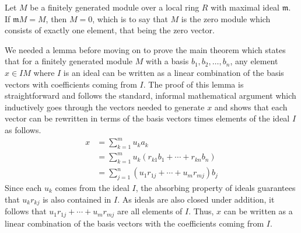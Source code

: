 \documentclass{article}
\begin{document}
\begin{theorem}
  Let \(M\) be a finitely generated module over a local ring \(R\) with maximal
  ideal \(\mathfrak{m}\). If \(\mathfrak{m} M = M\), then \(M = 0\), which is
  to say that \(M\) is the zero module which consists of exactly one element,
  that being the zero vector.
\end{theorem}

We needed a lemma before moving on to prove the main theorem which states that
for a finitely generated module \(M\) with a basis
\(b_{1}, b_{2}, \dots, b_{n}\), any element \(x\in I M\) where \(I\) is an
ideal can be written as a linear combination of the basis vectors with
coefficients coming from \(I\). The proof of this lemma is straightforward and
follows the standard, informal mathematical argument which inductively goes
through the vectors needed to generate \(x\) and shows that each vector can be
rewritten in terms of the basis vectors times elements of the ideal \(I\) as
follows.
\begin{align*}
  x & = \sum_{k=1}^{m} u_{k} a_{k} \\
    & = \sum_{k=1}^{m} u_{k} (r_{k1} b_{1} + \cdots + r_{kn} b_{n}) \\
    & = \sum_{j=1}^{n} (u_{1} r_{1j} + \cdots + u_{m} r_{mj}) b_{j}
\end{align*}
Since each \(u_{k}\) comes from the ideal \(I\), the absorbing property of
ideals guarantees that \(u_{k} r_{k j}\) is also contained in \(I\). As ideals
are also closed under addition, it follows that \(u_{1} r_{1j} + \cdots +
u_{m} r_{m j}\) are all elements of \(I\). Thus, \(x\) can be written as a
linear combination of the basis vectors with the coefficients coming from
\(I\).
\end{document}
